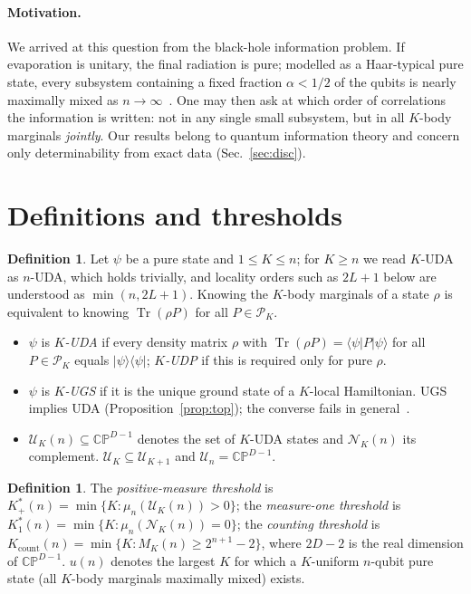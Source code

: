 \documentclass[aps,pra,onecolumn,superscriptaddress,nofootinbib,longbibliography,10pt]{revtex4-2}
\theoremstyle{definition}
\newtheorem{definition}[proposition]{Definition}
\newcommand{\CP}{\mathbb{CP}}
\newcommand{\Tr}{\operatorname{Tr}}
\newcommand{\Kp}{K^{*}_{+}}
\newcommand{\Ko}{K^{*}_{1}}
\newcommand{\Kc}{K_{\mathrm{count}}}
\begin{document}
\paragraph*{Motivation.} We arrived at this question from the black-hole information problem. If evaporation is unitary, the final radiation is pure; modelled as a Haar-typical pure state, every subsystem containing a fixed fraction $\alpha<1/2$ of the qubits is nearly maximally mixed as $n\to\infty$~\cite{Pag93a,Pag93b}. One may then ask at which order of correlations the information is written: not in any single small subsystem, but in all $K$-body marginals \emph{jointly}. Our results belong to quantum information theory and concern only determinability from exact data (Sec.~\ref{sec:disc}).

\section{Definitions and thresholds}

\begin{definition}
Let $\psi$ be a pure state and $1\le K\le n$; for $K\ge n$ we read $K$-UDA as $n$-UDA, which holds trivially, and locality orders such as $2L+1$ below are understood as $\min(n,2L+1)$. Knowing the $K$-body marginals of a state $\rho$ is equivalent to knowing $\Tr(\rho P)$ for all $P\in\mathcal P_K$.
\begin{itemize}
\item $\psi$ is \emph{$K$-UDA} if every density matrix $\rho$ with $\Tr(\rho P)=\langle\psi|P|\psi\rangle$ for all $P\in\mathcal P_K$ equals $|\psi\rangle\langle\psi|$; \emph{$K$-UDP} if this is required only for pure $\rho$.
\item $\psi$ is \emph{$K$-UGS} if it is the unique ground state of a $K$-local Hamiltonian. UGS implies UDA (Proposition~\ref{prop:top}); the converse fails in general~\cite{KJTV19}.
\item $\mathcal U_K(n)\subseteq\CP^{D-1}$ denotes the set of $K$-UDA states and $\mathcal N_K(n)$ its complement. $\mathcal U_K\subseteq\mathcal U_{K+1}$ and $\mathcal U_n=\CP^{D-1}$.
\end{itemize}
\end{definition}

\begin{definition}
The \emph{positive-measure threshold} is $\Kp(n)=\min\{K:\mu_n(\mathcal U_K(n))>0\}$; the \emph{measure-one threshold} is $\Ko(n)=\min\{K:\mu_n(\mathcal N_K(n))=0\}$; the \emph{counting threshold} is $\Kc(n)=\min\{K:M_K(n)\ge2^{n+1}-2\}$, where $2D-2$ is the real dimension of $\CP^{D-1}$. $u(n)$ denotes the largest $K$ for which a $K$-uniform $n$-qubit pure state (all $K$-body marginals maximally mixed) exists.
\end{definition}
\end{document}
